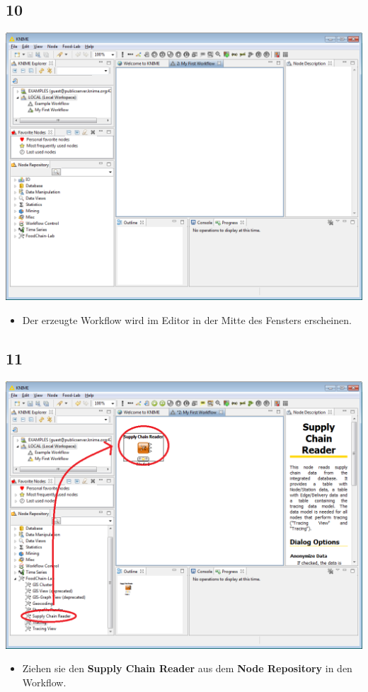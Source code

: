 \documentclass{beamer}
\begin{document}
\subsection{10}
\begin{frame}
	\begin{center}
  		\includegraphics[height=0.6\textheight]{10.png}
	\end{center}
	\begin{itemize}
		\item Der erzeugte Workflow wird im Editor in der Mitte des Fensters erscheinen.
	\end{itemize}
\end{frame}

\subsection{11}
\begin{frame}
	\begin{center}
  		\includegraphics[height=0.6\textheight]{11.png}
	\end{center}
	\begin{itemize}
		\item Ziehen sie den \textbf{Supply Chain Reader} aus dem \textbf{Node Repository} in den Workflow.
	\end{itemize}
\end{frame}
\end{document}
